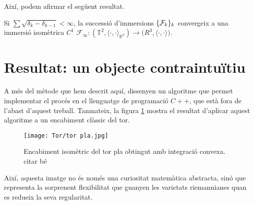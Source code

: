 Així, podem afirmar el següent resultat.
\begin{teo}
    Si $\sum\sqrt{\delta_k-\delta_{k-1}}<\infty$, la successió d'immersions $\{\mathcal F_k\}_k$ convergeix a una immersió isomètrica $C^1$ $\mathcal F_\infty:(\mathbb T^2, \langle\cdot, \cdot\rangle_{\mathbb R^2})\to\mathbb (R^3, \langle\cdot, \cdot\rangle)$.
\end{teo}

\section{Resultat: un objecte contraintuïtiu}
A més del mètode que hem descrit aquí, \cite{borrelli2013} dissenyen un algoritme que permet implementar el procés en el llenguatge de programació $C++$, que està fora de l'abast d'aquest treball. Tanmateix, la figura \ref{fig:tor_pl} mostra el resultat d'aplicar aquest algoritme a un encabiment clàssic del tor.
\begin{figure}[h!]
    \centering
    \texttt{[image: Tor/tor pla.jpg]}
    \caption{Encabiment isomètric del tor pla obtingut amb integració convexa.{\color{blue} citar bé}}
    \label{fig:tor_pl}
\end{figure}

Així, aquesta imatge no és només una curiositat matemàtica abstracta, sinó que representa la sorprenent flexibilitat que guanyen les varietats riemannianes quan es redueix la seva regularitat.
